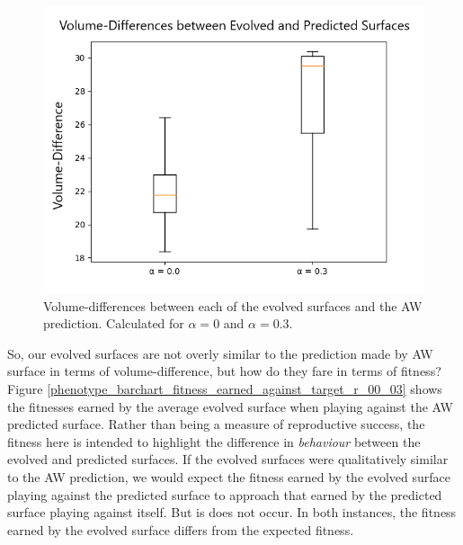 \documentclass[11pt]{book}
\newcommand*{\np}{\par\noindent\newline}
\begin{document}
\begin{figure}
	\centering
	\includegraphics[scale=0.7]{resources/distance_boxplot_r_00_03.png}
	\caption{Volume-differences between each of the evolved surfaces and the AW prediction. Calculated for $\alpha = 0$ and $\alpha = 0.3$.}
	\label{boxplot_volume_difference_symmetric}
\end{figure}


\np So, our evolved surfaces are not overly similar to the prediction made by AW surface in terms of volume-difference, but how do they fare in terms of fitness?
Figure \ref{phenotype_barchart_fitness_earned_against_target_r_00_03} shows the fitnesses earned by the average evolved surface when playing against the AW predicted surface.
Rather than being a measure of reproductive success, the fitness here is intended to highlight the difference in \textit{behaviour} between the evolved and predicted surfaces.
If the evolved surfaces were qualitatively similar to the AW prediction, we would expect the fitness earned by the evolved surface playing against the predicted surface to approach that earned by the predicted surface playing against itself.
But is does not occur.
In both instances, the fitness earned by the evolved surface differs from the expected fitness.
\end{document}
